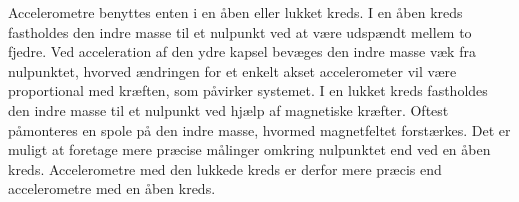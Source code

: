 Accelerometre benyttes enten i en åben eller lukket kreds. I en åben kreds fastholdes den indre masse til et nulpunkt ved at være udspændt mellem to fjedre. Ved acceleration af den ydre kapsel bevæges den indre masse væk fra nulpunktet, hvorved ændringen for et enkelt akset accelerometer vil være proportional med kræften, som påvirker systemet. \newline
I en lukket kreds fastholdes den indre masse til et nulpunkt ved hjælp af magnetiske kræfter. Oftest påmonteres en spole på den indre masse, hvormed magnetfeltet forstærkes. Det er muligt at foretage mere præcise målinger omkring nulpunktet end ved en åben kreds. Accelerometre med den lukkede kreds er derfor mere præcis end accelerometre med en åben kreds. \citep{Serway2010,TittertonWeston2004,Academic2016d}